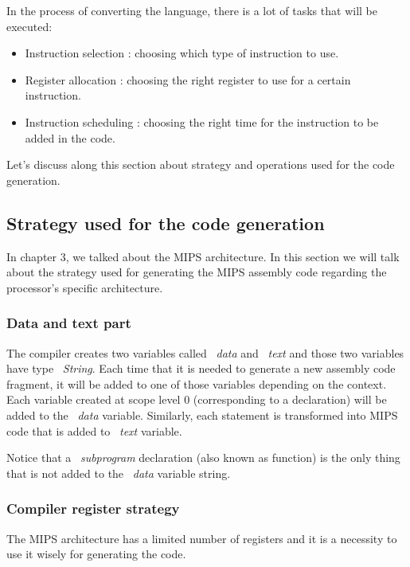 \documentclass[
  oneside,
  11pt, a4paper,
  footinclude=true,
  headinclude=true,
  cleardoublepage=empty
]{scrbook}
\begin{document}
In the process of converting the language, there is a lot of tasks that will be executed:

\begin{itemize}
\item Instruction selection : choosing which type of instruction to use.
\item Register allocation : choosing the right register to use for a certain instruction.
\item Instruction scheduling : choosing the right time for the instruction to be added in the code.
\end{itemize}

Let's discuss along this section about strategy and operations used for the code generation.

\subsection{Strategy used for the code generation}


In chapter 3, we talked about the MIPS architecture. In this section we will talk about the strategy used for generating the MIPS assembly code regarding the processor's specific architecture.

\subsubsection{Data and text part}

The compiler creates two variables called ~\textit{data} and ~\textit{text} and those two variables have type ~\textit{String}.
Each time that it is needed to generate a new assembly code fragment, it will be added to one of those variables depending on the context. Each variable created at scope level 0 (corresponding to a declaration) will be added to the ~\textit{data} variable. Similarly, each statement is transformed into MIPS code that is added to ~\textit{text} variable.

Notice that a ~\textit{subprogram} declaration (also known as function) is the only thing that is not added to the ~\textit{data} variable string.


\subsubsection{Compiler register strategy}

The MIPS architecture has a limited number of registers and it is a necessity to use it wisely for generating the code.
\end{document}
